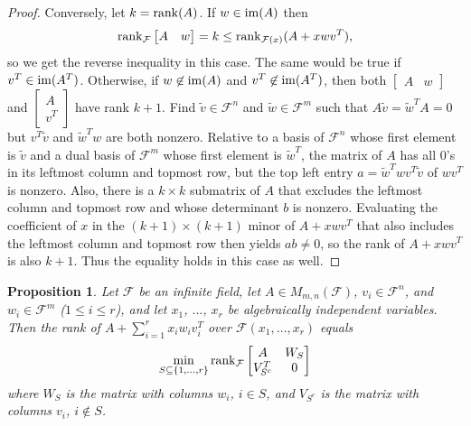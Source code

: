 \documentclass{amsart}
\newtheorem{prop}[thm]{Proposition}
\theoremstyle{definition}
\begin{document}
\begin{proof}
Conversely, let $k = {\rm rank}(A)$. If $w \in {\rm im}(A)$ then $${\rm rank}_{\mathcal{F}}\left[\begin{matrix} A&w\end{matrix}\right] = k \leq {\rm rank}_{\mathcal{F}(x)}(A + xwv^T),$$ so we get the reverse inequality in this case. The same would be true if $v^T \in {\rm im}(A^T)$. Otherwise, if $w \not\in {\rm im}(A)$ and $v^T \not\in {\rm im}(A^T)$, then both $\left[\begin{matrix} A&w\end{matrix}\right]$ and $\left[\begin{matrix} A\\ v^T\end{matrix}\right]$ have rank $k + 1$. Find $\tilde{v} \in \mathcal{F}^n$ and $\tilde{w} \in \mathcal{F}^m$ such that $A\tilde{v} = \tilde{w}^TA = 0$ but $v^T\tilde{v}$ and $\tilde{w}^Tw$ are both nonzero. Relative to a basis of $\mathcal{F}^n$ whose first element is $\tilde{v}$ and a dual basis of $\mathcal{F}^m$ whose first element is $\tilde{w}^T$, the matrix of $A$ has all $0$'s in its leftmost column and topmost row, but the top left entry $a = \tilde{w}^Twv^T\tilde{v}$ of $wv^T$ is nonzero. Also, there is a $k\times k$ submatrix of $A$ that excludes the leftmost column and topmost row and whose determinant $b$ is nonzero. Evaluating the coefficient of $x$ in the $(k+1)\times(k+1)$ minor of $A + xwv^T$ that also includes the leftmost column and topmost row then yields $ab \neq 0$, so the rank of $A + xwv^T$ is also $k + 1$. Thus the equality holds in this case as well.
\end{proof}

\begin{prop}\label{rankprop}
Let $\mathcal{F}$ be an infinite field, let $A \in M_{m,n}(\mathcal{F})$, $v_i \in \mathcal{F}^n$, and $w_i \in \mathcal{F}^m$ ($1 \leq i \leq r$), and let $x_1$, $\ldots$, $x_r$ be algebraically independent variables. Then the rank of $A + \sum_{i=1}^r x_iw_iv_i^T$ over $\mathcal{F}(x_1, \ldots, x_r)$ equals $$\min_{S \subseteq \{1, \ldots, r\}} {\rm rank}_{\mathcal{F}} \left[\begin{matrix} A&W_S\\ V_{S^c}^T&0\end{matrix}\right]$$ where $W_S$ is the matrix with columns $w_i$, $i \in S$, and $V_{S^c}$ is the matrix with columns $v_i$, $i \not\in S$.
\end{prop}
\end{document}

